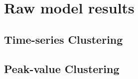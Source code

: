 \section{Raw model results}

\subsection{Time-series Clustering}

 
 
%  

\subsection{Peak-value Clustering}


